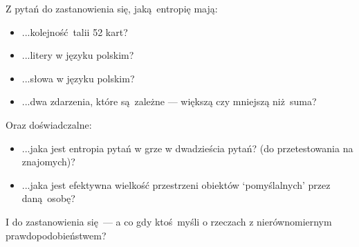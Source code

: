 \documentclass[10pt,a4paper]{article}
\begin{document}
Z pytań do zastanowienia się, jaką entropię mają:
\begin{itemize}
    \item ...kolejność talii 52 kart?
    \item ...litery w języku polskim?
    \item ...słowa w języku polskim?
    \item ...dwa zdarzenia, które są zależne --- większą czy mniejszą niż suma?
\end{itemize}

Oraz doświadczalne:
\begin{itemize}
    \item ...jaka jest entropia pytań w grze w dwadzieścia pytań? (do przetestowania na znajomych)?
    \item ...jaka jest efektywna wielkość przestrzeni obiektów `pomyślalnych' przez daną osobę?
\end{itemize}
I do zastanowienia się --- a co gdy ktoś myśli o rzeczach z nierównomiernym prawdopodobieństwem?
\end{document}
